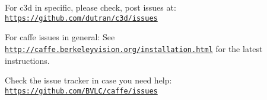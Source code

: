 For c3d in specific, please check, post issues at\-: \href{https://github.com/dutran/c3d/issues}{\tt https\-://github.\-com/dutran/c3d/issues}

For caffe issues in general\-: See \href{http://caffe.berkeleyvision.org/installation.html}{\tt http\-://caffe.\-berkeleyvision.\-org/installation.\-html} for the latest instructions.

Check the issue tracker in case you need help\-: \href{https://github.com/BVLC/caffe/issues}{\tt https\-://github.\-com/\-B\-V\-L\-C/caffe/issues} 